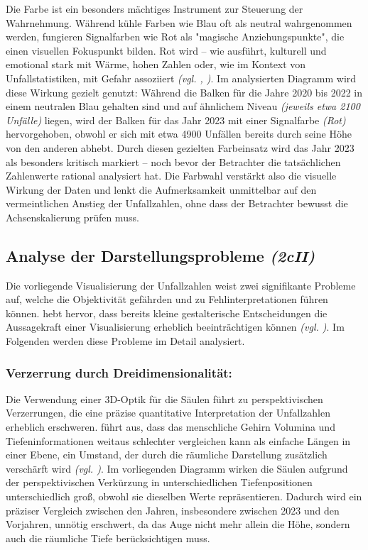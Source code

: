 Die Farbe ist ein besonders mächtiges Instrument zur Steuerung der Wahrnehmung. Während kühle Farben wie Blau oft als neutral wahrgenommen werden, fungieren Signalfarben wie Rot als "magische Anziehungspunkte", die einen visuellen Fokuspunkt bilden. Rot wird – wie \citeauthor{1} ausführt, kulturell und emotional stark mit Wärme, hohen Zahlen oder, wie im Kontext von Unfallstatistiken, mit Gefahr assoziiert \textit{(\acs{vgl.} \cite[48, 49]{1}, \cite[31, 84]{2})}. Im analysierten Diagramm wird diese Wirkung gezielt genutzt: Während die Balken für die Jahre 2020 bis 2022 in einem neutralen Blau gehalten sind und auf ähnlichem Niveau \textit{(jeweils etwa 2100 Unfälle)} liegen, wird der Balken für das Jahr 2023 mit einer Signalfarbe \textit{(Rot)} hervorgehoben, obwohl er sich mit etwa 4900 Unfällen bereits durch seine Höhe von den anderen abhebt. Durch diesen gezielten Farbeinsatz wird das Jahr 2023 als besonders kritisch markiert – noch bevor der Betrachter die tatsächlichen Zahlenwerte rational analysiert hat. Die Farbwahl verstärkt also die visuelle Wirkung der Daten und lenkt die Aufmerksamkeit unmittelbar auf den vermeintlichen Anstieg der Unfallzahlen, ohne dass der Betrachter bewusst die Achsenskalierung prüfen muss.


\subsection{Analyse der Darstellungsprobleme \textit{(2cII)}}

Die vorliegende Visualisierung der Unfallzahlen weist zwei signifikante Probleme auf, welche die Objektivität gefährden und zu Fehlinterpretationen führen können. \citeauthor{2} hebt hervor, dass bereits kleine gestalterische Entscheidungen die Aussagekraft einer Visualisierung erheblich beeinträchtigen können \textit{(\acs{vgl.} \cite[54]{2})}. Im Folgenden werden diese Probleme im Detail analysiert.

\subsubsection{Verzerrung durch Dreidimensionalität:}
Die Verwendung einer 3D-Optik für die Säulen führt zu perspektivischen Verzerrungen, die eine präzise quantitative Interpretation der Unfallzahlen erheblich erschweren. \citeauthor{2} führt aus, dass das menschliche Gehirn Volumina und Tiefeninformationen weitaus schlechter vergleichen kann als einfache Längen in einer Ebene, ein Umstand, der durch die räumliche Darstellung zusätzlich verschärft wird \textit{(\acs{vgl.} \cite[27, 54, 58]{2})}. Im vorliegenden Diagramm wirken die Säulen aufgrund der perspektivischen Verkürzung in unterschiedlichen Tiefenpositionen unterschiedlich groß, obwohl sie dieselben Werte repräsentieren. Dadurch wird ein präziser Vergleich zwischen den Jahren, insbesondere zwischen 2023 und den Vorjahren, unnötig erschwert, da das Auge nicht mehr allein die Höhe, sondern auch die räumliche Tiefe berücksichtigen muss.

